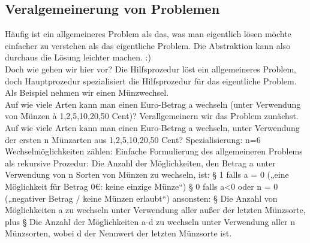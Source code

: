 \subsection{Veralgemeinerung von Problemen}
Häufig ist ein allgemeineres Problem als das, was man eigentlich lösen möchte einfacher zu verstehen als das eigentliche Problem. Die Abstraktion kann also durchaus die Lösung leichter machen. :)\\
Doch wie gehen wir hier vor? Die Hilfsprozedur löst ein allgemeineres Problem, doch Hauptprozedur spezialisiert die Hilfsprozedur für das eigentliche Problem.
Als Beispiel nehmen wir einen Münzwechsel. \\
Auf wie viele Arten kann man einen Euro-Betrag a wechseln (unter Verwendung von Münzen à 1,2,5,10,20,50 Cent)? Verallgemeinern wir das Problem zunächst. Auf wie viele Arten kann man einen Euro-Betrag a wechseln, unter Verwendung der ersten n Münzarten aus 1,2,5,10,20,50 Cent? Spezialisierung: n=6\\
Wechselmöglichkeiten zählen: Einfache Formulierung des
allgemeineren Problems als rekursive Prozedur:
Die Anzahl der Möglichkeiten, den Betrag a unter Verwendung von n
Sorten von Münzen zu wechseln, ist:
§  1 falls a = 0 („eine Möglichkeit für Betrag 0€: keine einzige Münze“)
§  0 falls a<0 oder n = 0 („negativer Betrag / keine Münzen erlaubt“)
ansonsten:
§  Die Anzahl von Möglichkeiten a zu wechseln unter Verwendung aller außer
der letzten Münzsorte, plus
§  Die Anzahl der Möglichkeiten a-d zu wechseln unter Verwendung aller n
Münzsorten, wobei d der Nennwert der letzten Münzsorte ist.

